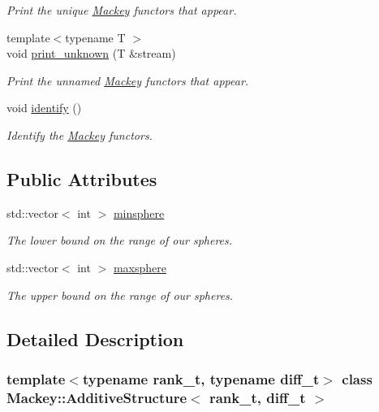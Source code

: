 \begin{DoxyCompactItemize}
\begin{DoxyCompactList}\small\item\em Print the unique \hyperlink{namespaceMackey}{Mackey} functors that appear. \end{DoxyCompactList}\item 
{\footnotesize template$<$typename T $>$ }\\void \hyperlink{classMackey_1_1AdditiveStructure_a6c68d66e89c3ad3a81dde8fd35837c3c}{print\+\_\+unknown} (T \&stream)
\begin{DoxyCompactList}\small\item\em Print the unnamed \hyperlink{namespaceMackey}{Mackey} functors that appear. \end{DoxyCompactList}\item 
void \hyperlink{classMackey_1_1AdditiveStructure_a07887e78e182c1215fc7c8af3f385529}{identify} ()
\begin{DoxyCompactList}\small\item\em Identify the \hyperlink{namespaceMackey}{Mackey} functors. \end{DoxyCompactList}\end{DoxyCompactItemize}
\subsection*{Public Attributes}
\begin{DoxyCompactItemize}
\item 
std\+::vector$<$ int $>$ \hyperlink{classMackey_1_1AdditiveStructure_a1158af906d8bb5b9dcc7eed72367f25e}{minsphere}
\begin{DoxyCompactList}\small\item\em The lower bound on the range of our spheres. \end{DoxyCompactList}\item 
std\+::vector$<$ int $>$ \hyperlink{classMackey_1_1AdditiveStructure_a1d26ee2b19d9d66744ee4d79c302d9c4}{maxsphere}
\begin{DoxyCompactList}\small\item\em The upper bound on the range of our spheres. \end{DoxyCompactList}\end{DoxyCompactItemize}


\subsection{Detailed Description}
\subsubsection*{template$<$typename rank\+\_\+t, typename diff\+\_\+t$>$\newline
class Mackey\+::\+Additive\+Structure$<$ rank\+\_\+t, diff\+\_\+t $>$}


